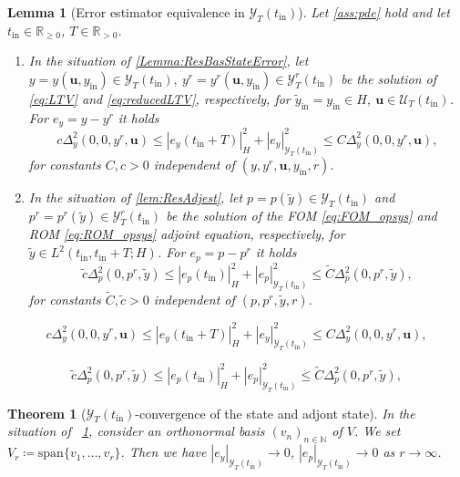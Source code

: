 \documentclass[10pt,a4paper]{amsart}
\newtheorem{lemma}{Lemma}
\newtheorem{theorem}{Theorem}
\newcommand{\N}{\mathbb N}
\def\R{\mathbb{R}}
\newcommand{\bu}{\mathbf{u}}
\newcommand{\mU}{{\mathscr U}}
\newcommand{\mY}{{\mathscr Y}}
\newcommand{\norm}[2]{\left|#1\right|_{#2}}
\newcommand{\tildeyint}{\tilde y_{\mathrm{in}}}
\newcommand{\tint}{t_{\mathrm{in}}}
\newcommand{\yint}{y_{\mathrm{in}}}
\begin{document}
\begin{lemma}[Error estimator equivalence in $\mY_T(\tint)$]\label{lemma:app_error_equivalence}
    Let \cref{ass:pde} hold and let $\tint\in\R_{\geq0}$, $T\in \R_{>0}$.
    \begin{enumerate}
        \item In the situation of \cref{Lemma:ResBasStateError}, let $y=y(\bu,\yint)\in \mY_T(\tint),\  y^r=y^r(\bu,\yint)\in \mY^r_T(\tint)$ be the solution of \eqref{eq:LTV} and \eqref{eq:reducedLTV}, respectively, for $\tildeyint=\yint\in H$, $\bu\in \mU_T(\tint)$. For $e_y = y-y^r$ it holds
     \begin{equation}\label{eq:state_errorest_equiv}
     c \Delta^2_{y}(0,0, y^r,\bu)\leq \norm{e_y(\tint+T)}{H}^2+\norm{e_y}{\mY_T(\tint)}^2\leq C\Delta^2_y(0,0,y^r, \bu),
    \end{equation}
    for constants $C,c>0$ independent of $(y,y^r,\bu, \yint,r)$.
    \item In the situation of \cref{lem:ResAdjest}, let $p=p(\tilde y)\in  \mY_T(\tint)$ and $p^r=p^r(\tilde y)\in \mY^r_T(\tint)$ be the solution of the FOM \eqref{eq:FOM_opsys} and ROM \eqref{eq:ROM_opsys} adjoint equation, respectively, for $\tilde y\in L^2(\tint,\tint+T;H)$. For $e_p = p-p^r$ it holds
    \begin{equation}\label{eq:adstate_errorest_equiv}
    \tilde c\Delta^2_{p}(0, p^r, \tilde y) \leq \norm{e_p(\tint)}{H}^2+\norm{e_p}{\mY_T(\tint)}^2\leq \tilde C\Delta^2_{p}(0, p^r, \tilde y),
    \end{equation}
    for constants $\tilde C,\tilde c>0$ independent of $(p,p^r,\tilde y,r)$.
    \end{enumerate}
\end{lemma}

     \begin{equation}
     c \Delta^2_{y}(0,0, y^r,\bu)\leq \norm{e_y(\tint+T)}{H}^2+\norm{e_y}{\mY_T(\tint)}^2\leq C\Delta^2_y(0,0,y^r, \bu),
    \end{equation}

    \begin{equation}
    \tilde c\Delta^2_{p}(0, p^r, \tilde y) \leq \norm{e_p(\tint)}{H}^2+\norm{e_p}{\mY_T(\tint)}^2\leq \tilde C\Delta^2_{p}(0, p^r, \tilde y),
    \end{equation}

\begin{theorem}[$\mY_T(\tint)$-convergence of the state and adjont state]\label{theo:APP_convergence}
%
In the situation of \ \cref{lemma:app_error_equivalence}, 
consider an orthonormal basis $(v_n)_{n\in \N}$ of $V$. We set $V_r\coloneqq \text{span}\{v_1,\ldots,v_r\}$. Then we have $\norm{ e_y}{\mY_T(\tint)}\to 0$, $\norm{ e_p}{\mY_T(\tint)}\to 0$ as $r\to \infty$. 
%
\end{theorem}
\end{document}

